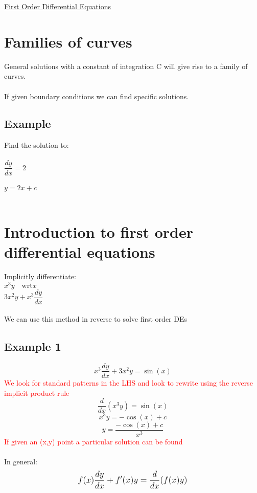 \documentclass{article}[18pt]
\begin{document}
\begin{center}
\underline{\huge First Order Differential Equations}
\end{center}
\section{Families of curves}
General solutions with a constant of integration C will give rise to a family of curves.\\
\\
If given boundary conditions we can find specific solutions.
\subsection{Example}
Find the solution to:\\
\\
$\dfrac{dy}{dx}=2$\\
\\
$y=2x+c$\\
\\

\section{Introduction to first order differential equations}
Implicitly differentiate:\\
$x^3y \quad \textrm{wrt}x$\\
$3x^2y+x^3\dfrac{dy}{dx}$\\
\\
We can use this method in reverse to solve first order DEs
\subsection{Example 1}
$$x^3\dfrac{dy}{dx}+3x^2y=\sin(x)$$
\textcolor{red}{We look for standard patterns in the LHS and look to rewrite using the reverse implicit product rule}\\
$$\frac{d}{dx}(x^3y)=\sin(x)$$
$$x^3y=-\cos(x)+c$$
$$y=\frac{-\cos(x)+c}{x^3}$$
\textcolor{red}{If given an (x,y) point a particular solution can be found}\\
\\
In general:
$$\mathlarger{f(x)\frac{dy}{dx}+f'(x)y=\frac{d}{dx}(f(x)y)}$$
\newpage
\end{document}
